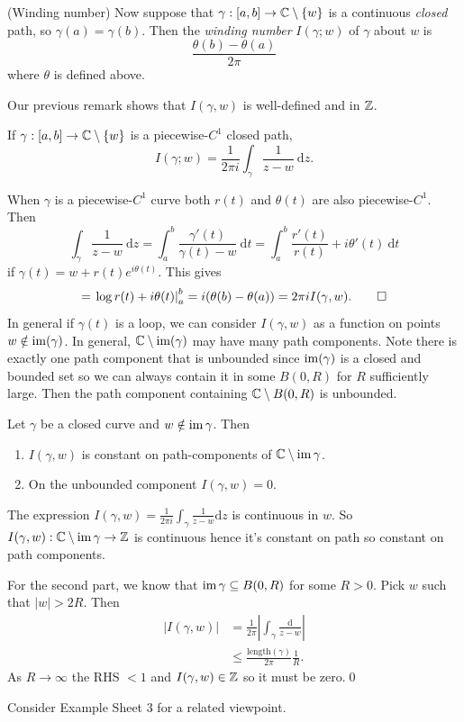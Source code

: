 \documentclass{article}
\begin{document}
\begin{definition}
	(Winding number) Now suppose that $ \gamma:[a,b]\to \mathbb{C}\setminus \{w\} $ is a continuous \textit{closed} path, so $ \gamma(a)=\gamma(b) $. Then the \textit{winding number} $ I(\gamma;w) $ of $ \gamma $ about $ w $ is
	\[
		\frac{\theta(b)-\theta(a)}{2\pi}
	\]
	where $ \theta $ is defined above.
\end{definition}
\begin{remark}
  Our previous remark shows that $ I(\gamma,w) $ is well-defined and in $ \mathbb{Z} $.
\end{remark}
\begin{lemma}
	If $ \gamma:[a,b]\to \mathbb{C}\setminus \{w\} $ is a piecewise-$ C^1 $ closed path,
	\[
		I(\gamma;w) = \frac 1{2\pi i} \int_\gamma \frac 1{z-w} \ \mathrm dz.
	\]
\end{lemma}
\pf When $ \gamma $ is a piecewise-$ C^1 $ curve both $ r(t) $ and $ \theta(t) $ are also piecewise-$ C^1 $. Then
\[
	\int_\gamma\frac1{z-w}\ \mathrm dz = \int_a^b \frac{\gamma'(t)}{\gamma(t) - w} \ \mathrm dt = \int_a^b \frac{r'(t)}{r(t)} + i \theta'(t) \ \mathrm dt
\]
if $ \gamma(t) = w+ r(t)e^{i\theta(t)} $. This gives
\[
  = \left.\log r(t) + i \theta (t)\right|^b_a = i(\theta(b)-\theta(a))=2\pi i I(\gamma,w).\qed
\]
In general if $ \gamma(t) $ is a loop, we can consider $ I(\gamma,w) $ as a function on points $ w\notin \operatorname{im}(\gamma) $. In general, $ \mathbb{C}\setminus \operatorname{im}(\gamma) $ may have many path components. Note there is exactly one path component that is unbounded since $ \operatorname{im}(\gamma) $ is a closed and bounded set so we can always contain it in some $ B(0, R) $ for $ R $ sufficiently large. Then the path component containing $ \mathbb{C} \setminus B(0,R) $ is unbounded.
\begin{proposition}
  Let $ \gamma $ be a closed curve and $ w\notin \operatorname{im}\gamma $. Then
  \begin{enumerate}
	  \item $ I(\gamma,w) $ is constant on path-components of $ \mathbb{C}\setminus \operatorname{im} \gamma $.
	  \item On the unbounded component $ I(\gamma, w) = 0 $.
  \end{enumerate}
\end{proposition}
\pf The expression $ I(\gamma,w) = \frac 1{2\pi i} \int_\gamma \frac 1{z-w} \mathrm dz $ is continuous in $ w $. So $ I(\gamma,w) : \mathbb{C}\setminus \operatorname{im} \gamma \to \mathbb{Z}$ is continuous hence it's constant on path so constant on path components.\par
For the second part, we know that $ \operatorname{im}\gamma\subseteq B(0,R) $ for some $ R>0 $. Pick $ w $ such that $ |w| > 2R $. Then
\begin{align*}
	|I(\gamma,w)| &= \frac 1{2\pi } \left| \int_\gamma \frac{\mathrm d}{z-w}\right| \\
		      &\le \frac{\mathrm{length}(\gamma)}{2\pi} \frac 1R.
\end{align*}
As $ R\to \infty $ the RHS $ <1 $ and $ I(\gamma,w)\in \mathbb{Z} $ so it must be zero.\qed
\begin{remark}
  Consider Example Sheet 3 for a related viewpoint.
\end{remark}
\end{document}
